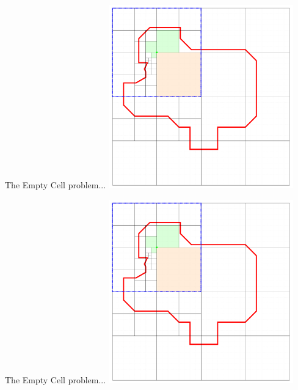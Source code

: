 \documentclass{beamer}
\begin{document}
\begin{frame}{The Empty Cell problem...}
    \centering
	\includegraphics[page=2,width=0.6\textwidth]{figures/05-EmptyCells/Example}
\end{frame}
\begin{frame}{The Empty Cell problem...}
    \centering
	\includegraphics[page=3,width=0.6\textwidth]{figures/05-EmptyCells/Example}
\end{frame}
\end{document}
